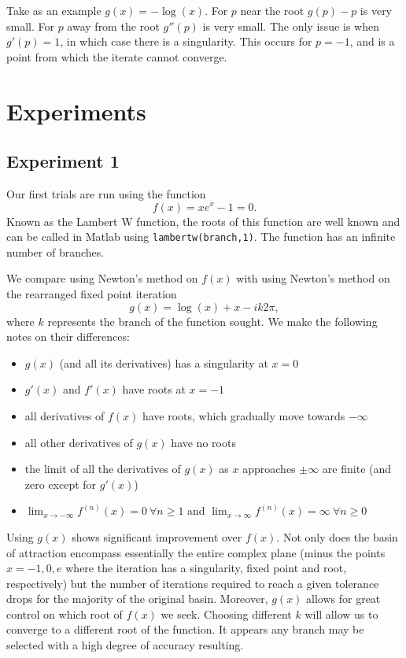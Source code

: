 \documentclass{book}
\begin{document}
Take as an example $g(x) = -\log(x)$.
For $p$ near the root $g(p) - p$ is very small.
For $p$ away from the root $g''(p)$ is very small.
The only issue is when $g'(p) = 1$, in which case there is a singularity.
This occurs for $p=-1$, and is a point from which the iterate cannot converge.

\section{Experiments}

\subsection{Experiment 1}

Our first trials are run using the function
\begin{equation}
f(x) = x e^x - 1 = 0 .
\end{equation}
Known as the Lambert W function, the roots of this function are well known and can be called in Matlab using \texttt{lambertw(branch,1)}.
The function has an infinite number of branches.

We compare using Newton's method on $f(x)$ with using Newton's method on the rearranged fixed point iteration
\begin{equation*}
g(x) = \log(x) + x - i k 2 \pi ,
\end{equation*}
where $k$ represents the branch of the function sought.
We make the following notes on their differences:
\begin{itemize}
\item $g(x)$ (and all its derivatives) has a singularity at $x=0$
\item $g'(x)$ and $f'(x)$ have roots at $x=-1$
\item all derivatives of $f(x)$ have roots, which gradually move towards $-\infty$
\item all other derivatives of $g(x)$ have no roots
\item the limit of all the derivatives of $g(x)$ as $x$ approaches $\pm \infty$ are finite (and zero except for $g'(x)$)
\item $\lim_{x \to -\infty} f^{(n)}(x) = 0 \ \forall n\geq 1$ and $\lim_{x \to \infty} f^{(n)}(x) = \infty \ \forall n \geq 0$
\end{itemize}

Using $g(x)$ shows significant improvement over $f(x)$.
Not only does the basin of attraction encompass essentially the entire complex plane (minus the points $x=-1, 0, e$ where the iteration has a singularity, fixed point and root, respectively) but the number of iterations required to reach a given tolerance drops for the majority of the original basin.
Moreover, $g(x)$ allows for great control on which root of $f(x)$ we seek.
Choosing different $k$ will allow us to converge to a different root of the function.
It appears any branch may be selected with a high degree of accuracy resulting.
\end{document}
